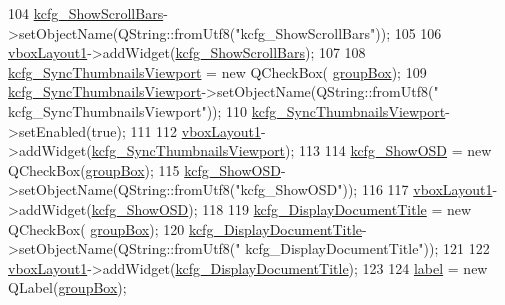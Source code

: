 \begin{DoxyCode}
104         \hyperlink{classUi__DlgGeneralBase_a58a8f3825a9f66542cd2e6e7e6e66ee9}{kcfg\_ShowScrollBars}->setObjectName(QString::fromUtf8(\textcolor{stringliteral}{"kcfg\_ShowScrollBars"}));
105 
106         \hyperlink{classUi__DlgGeneralBase_ada5c5c425bafcc272b9562c93ed886e8}{vboxLayout1}->addWidget(\hyperlink{classUi__DlgGeneralBase_a58a8f3825a9f66542cd2e6e7e6e66ee9}{kcfg\_ShowScrollBars});
107 
108         \hyperlink{classUi__DlgGeneralBase_a3bd89dac60042cf193e8f294f8d255b1}{kcfg\_SyncThumbnailsViewport} = \textcolor{keyword}{new} QCheckBox(
      \hyperlink{classUi__DlgGeneralBase_aa25408255cc1bc3b6d720b58ceb42e32}{groupBox});
109         \hyperlink{classUi__DlgGeneralBase_a3bd89dac60042cf193e8f294f8d255b1}{kcfg\_SyncThumbnailsViewport}->setObjectName(QString::fromUtf8(\textcolor{stringliteral}{"
      kcfg\_SyncThumbnailsViewport"}));
110         \hyperlink{classUi__DlgGeneralBase_a3bd89dac60042cf193e8f294f8d255b1}{kcfg\_SyncThumbnailsViewport}->setEnabled(\textcolor{keyword}{true});
111 
112         \hyperlink{classUi__DlgGeneralBase_ada5c5c425bafcc272b9562c93ed886e8}{vboxLayout1}->addWidget(\hyperlink{classUi__DlgGeneralBase_a3bd89dac60042cf193e8f294f8d255b1}{kcfg\_SyncThumbnailsViewport});
113 
114         \hyperlink{classUi__DlgGeneralBase_a15d077fb29bfbb39a64bf54cccb9a0d3}{kcfg\_ShowOSD} = \textcolor{keyword}{new} QCheckBox(\hyperlink{classUi__DlgGeneralBase_aa25408255cc1bc3b6d720b58ceb42e32}{groupBox});
115         \hyperlink{classUi__DlgGeneralBase_a15d077fb29bfbb39a64bf54cccb9a0d3}{kcfg\_ShowOSD}->setObjectName(QString::fromUtf8(\textcolor{stringliteral}{"kcfg\_ShowOSD"}));
116 
117         \hyperlink{classUi__DlgGeneralBase_ada5c5c425bafcc272b9562c93ed886e8}{vboxLayout1}->addWidget(\hyperlink{classUi__DlgGeneralBase_a15d077fb29bfbb39a64bf54cccb9a0d3}{kcfg\_ShowOSD});
118 
119         \hyperlink{classUi__DlgGeneralBase_a0283039d02817b23b8f52f3b670bd9a8}{kcfg\_DisplayDocumentTitle} = \textcolor{keyword}{new} QCheckBox(
      \hyperlink{classUi__DlgGeneralBase_aa25408255cc1bc3b6d720b58ceb42e32}{groupBox});
120         \hyperlink{classUi__DlgGeneralBase_a0283039d02817b23b8f52f3b670bd9a8}{kcfg\_DisplayDocumentTitle}->setObjectName(QString::fromUtf8(\textcolor{stringliteral}{"
      kcfg\_DisplayDocumentTitle"}));
121 
122         \hyperlink{classUi__DlgGeneralBase_ada5c5c425bafcc272b9562c93ed886e8}{vboxLayout1}->addWidget(\hyperlink{classUi__DlgGeneralBase_a0283039d02817b23b8f52f3b670bd9a8}{kcfg\_DisplayDocumentTitle});
123 
124         \hyperlink{classUi__DlgGeneralBase_a6580c8bff94e006f767780163d3ca0da}{label} = \textcolor{keyword}{new} QLabel(\hyperlink{classUi__DlgGeneralBase_aa25408255cc1bc3b6d720b58ceb42e32}{groupBox});

\end{DoxyCode}
